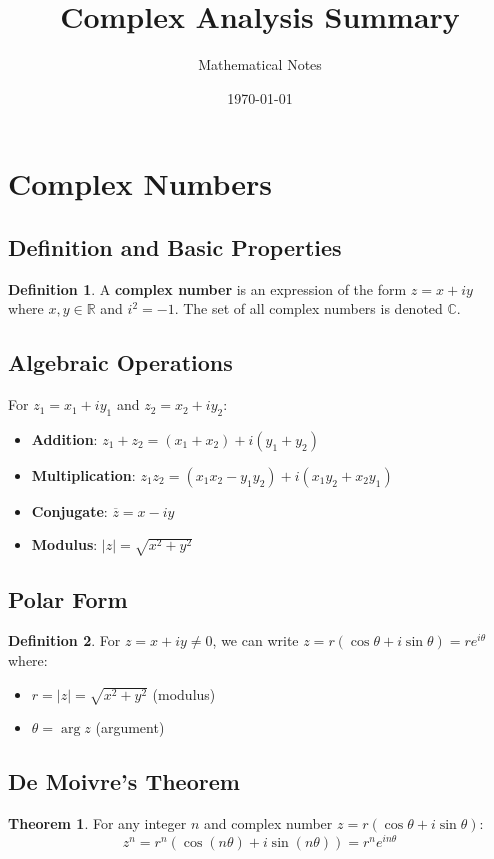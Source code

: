 \documentclass[11pt]{article}
\title{Complex Analysis Summary}
\author{Mathematical Notes}
\date{\today}
\theoremstyle{definition}
\newtheorem{definition}{Definition}[section]
\newtheorem{theorem}{Theorem}[section]
\begin{document}
\maketitle

\tableofcontents
\newpage

\section{Complex Numbers}

\subsection{Definition and Basic Properties}
\begin{definition}
A \textbf{complex number} is an expression of the form $z = x + iy$ where $x, y \in \mathbb{R}$ and $i^2 = -1$. The set of all complex numbers is denoted $\mathbb{C}$.
\end{definition}

\subsection{Algebraic Operations}
For $z_1 = x_1 + iy_1$ and $z_2 = x_2 + iy_2$:
\begin{itemize}
    \item \textbf{Addition}: $z_1 + z_2 = (x_1 + x_2) + i(y_1 + y_2)$
    \item \textbf{Multiplication}: $z_1 z_2 = (x_1 x_2 - y_1 y_2) + i(x_1 y_2 + x_2 y_1)$
    \item \textbf{Conjugate}: $\overline{z} = x - iy$
    \item \textbf{Modulus}: $|z| = \sqrt{x^2 + y^2}$
\end{itemize}

\subsection{Polar Form}
\begin{definition}
For $z = x + iy \neq 0$, we can write $z = r(\cos\theta + i\sin\theta) = re^{i\theta}$ where:
\begin{itemize}
    \item $r = |z| = \sqrt{x^2 + y^2}$ (modulus)
    \item $\theta = \arg z$ (argument)
\end{itemize}
\end{definition}

\subsection{De Moivre's Theorem}
\begin{theorem}
For any integer $n$ and complex number $z = r(\cos\theta + i\sin\theta)$:
$$z^n = r^n(\cos(n\theta) + i\sin(n\theta)) = r^n e^{in\theta}$$
\end{theorem}
\end{document}
